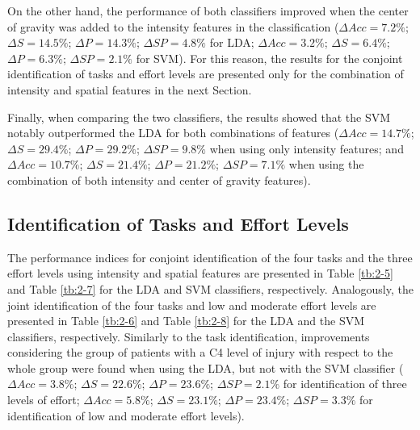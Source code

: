 On the other hand, the performance of both classifiers improved when the center of gravity was added to the intensity features in the classification ($\Delta Acc= 7.2\%$; $\Delta S= 14.5\%$; $\Delta P= 14.3\%$; $\Delta SP= 4.8\%$ for LDA; $\Delta Acc= 3.2\%$; $\Delta S= 6.4\%$; $\Delta P= 6.3\%$; $\Delta SP= 2.1\%$ for SVM). For this reason, the results for the conjoint identification of tasks and effort levels are presented only for the combination of intensity and spatial features in the next Section.

Finally, when comparing the two classifiers, the results showed that the SVM notably outperformed the LDA for both combinations of features ($\Delta Acc= 14.7\%$; $\Delta S= 29.4\%$; $\Delta P= 29.2\%$; $\Delta SP= 9.8\%$ when using only intensity features; and $\Delta Acc= 10.7\%$; $\Delta S= 21.4\%$; $\Delta P= 21.2\%$; $\Delta SP= 7.1\%$ when using the combination of both intensity and center of gravity features).


\subsection{Identification of Tasks and Effort Levels}
The performance indices for conjoint identification of the four tasks and the three effort levels using intensity and spatial features are presented in Table \ref{tb:2-5} and Table \ref{tb:2-7} for the LDA and SVM classifiers, respectively. Analogously, the joint identification of the four tasks and low and moderate effort levels are presented in Table \ref{tb:2-6} and Table \ref{tb:2-8} for the LDA and the SVM classifiers, respectively.
Similarly to the task identification, improvements considering the group of patients with a C4 level of injury with respect to the whole group were found when using the LDA, but not with the SVM classifier ($\Delta Acc= 3.8\%$; $\Delta S= 22.6\%$; $\Delta P= 23.6\%$; $\Delta SP= 2.1\%$ for identification of three levels of effort; $\Delta Acc= 5.8\%$; $\Delta S= 23.1\%$; $\Delta P= 23.4\%$; $\Delta SP= 3.3\%$ for identification of low and moderate effort levels).

